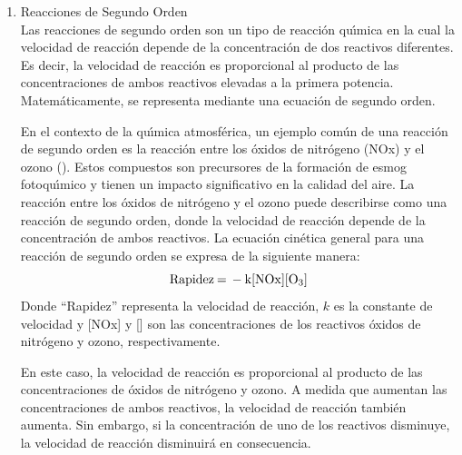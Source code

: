 \begin{enumerate}
En resumen, una reacci\'on de primer orden es aquella en la que la velocidad de reacci\'on es directamente proporcional a la concentraci\'on de un solo reactivo elevado a la primera potencia. Estas reacciones se describen mediante una expresi\'on matem\'atica que muestra c\'omo la velocidad de reacci\'on var\'{\i}a con la concentraci\'on del reactivo. En el caso de una reacci\'on atmosf\'erica, la descomposici\'on del ozono puede considerarse como una reacci\'on de primer orden, donde la velocidad de descomposici\'on est\'a determinada principalmente por la concentraci\'on de ozono presente en la atm\'osfera.

\item Reacciones de Segundo Orden  \\
Las reacciones de segundo orden son un tipo de reacci\'on qu\'{\i}mica en la cual la velocidad de reacci\'on depende de la concentraci\'on de dos reactivos diferentes. Es decir, la velocidad de reacci\'on es proporcional al producto de las concentraciones de ambos reactivos elevadas a la primera potencia. Matem\'aticamente, se representa mediante una ecuaci\'on de segundo orden.

En el contexto de la qu\'{\i}mica atmosf\'erica, un ejemplo com\'un de una reacci\'on de segundo orden es la reacci\'on entre los \'oxidos de nitr\'ogeno (NOx) y el ozono (). Estos compuestos son precursores de la formaci\'on de esmog fotoqu\'{\i}mico y tienen un impacto significativo en la calidad del aire.
La reacci\'on entre los \'oxidos de nitr\'ogeno y el ozono puede describirse como una reacci\'on de segundo orden, donde la velocidad de reacci\'on depende de la concentraci\'on de ambos reactivos. La ecuaci\'on cin\'etica general para una reacci\'on de segundo orden se expresa de la siguiente manera:
 \begin{equation*}
\ce{Rapidez = - k[NOx][O3]}
 \end{equation*}
Donde ``Rapidez'' representa la velocidad de reacci\'on, $k$ es la constante de velocidad y [NOx] y [] son las concentraciones de los reactivos \'oxidos de nitr\'ogeno y ozono, respectivamente.

En este caso, la velocidad de reacci\'on es proporcional al producto de las concentraciones de \'oxidos de nitr\'ogeno y ozono. A medida que aumentan las concentraciones de ambos reactivos, la velocidad de reacci\'on tambi\'en aumenta. Sin embargo, si la concentraci\'on de uno de los reactivos disminuye, la velocidad de reacci\'on disminuir\'a en consecuencia.


\end{enumerate}
